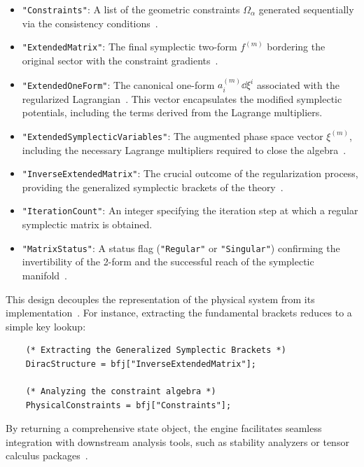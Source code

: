 \documentclass[11pt,a4paper]{article}
\begin{document}
\begin{itemize}
	\item \texttt{"Constraints"}: A list of the geometric constraints $\Omega_\alpha$ generated sequentially via the consistency conditions~\cite{Dirac1964,BarcelosNetoWotzasek1992}.
	\item \texttt{"ExtendedMatrix"}: The final symplectic two-form $f^{(m)}$ bordering the original sector with the constraint gradients~\cite{FaddeevJackiw1988}.
	\item \texttt{"ExtendedOneForm"}: The canonical one-form $a^{(m)}_i \dd \xi^i$ associated with the regularized Lagrangian~\cite{ArnoldBook,Marsden1999}. This vector encapsulates the modified symplectic potentials, including the terms derived from the Lagrange multipliers.
	\item \texttt{"ExtendedSymplecticVariables"}: The augmented phase space vector $\xi^{(m)}$, including the necessary Lagrange multipliers required to close the algebra~\cite{Henneaux1992,GitmanTyutin1990}.
	\item \texttt{"InverseExtendedMatrix"}: The crucial outcome of the regularization process, providing the generalized symplectic brackets of the theory~\cite{Dirac1964,FaddeevJackiw1988}.
	\item \texttt{"IterationCount"}: An integer specifying the iteration step at which a regular symplectic matrix is obtained.
	\item \texttt{"MatrixStatus"}: A status flag (\texttt{"Regular"} or \texttt{"Singular"}) confirming the invertibility of the 2-form and the successful reach of the symplectic manifold~\cite{Gotay1978,ArnoldBook}.
\end{itemize}

This design decouples the representation of the physical system from its implementation~\cite{Wolfram2002,Gorard2024}. For instance, extracting the fundamental brackets reduces to a simple key lookup:
\begin{verbatim}
	(* Extracting the Generalized Symplectic Brackets *)
	DiracStructure = bfj["InverseExtendedMatrix"];
	
	(* Analyzing the constraint algebra *)
	PhysicalConstraints = bfj["Constraints"];
\end{verbatim}
By returning a comprehensive state object, the engine facilitates seamless integration with downstream analysis tools, such as stability analyzers or tensor calculus packages~\cite{mgarcia,Nakahara2003}.
\end{document}
